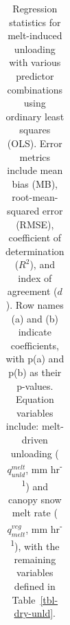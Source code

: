 \documentclass[
  letterpaper,
]{tex/uofsthesis-cs}
\begin{document}
\begin{landscape}

\begin{longtable}[]{@{}
  >{\raggedright\arraybackslash}p{}
  >{\raggedright\arraybackslash}p{}
  >{\raggedright\arraybackslash}p{}
  >{\raggedright\arraybackslash}p{}
  >{\raggedright\arraybackslash}p{}
  >{\raggedright\arraybackslash}p{}@{}}

\caption{\label{tbl-melt-unld}Regression statistics for melt-induced
unloading with various predictor combinations using ordinary least
squares (OLS). Error metrics include mean bias (MB), root-mean-squared
error (RMSE), coefficient of determination (\(R^2\)), and index of
agreement (\(d\)). Row names (a) and (b) indicate coefficients, with
p(a) and p(b) as their p-values. Equation variables include: melt-driven
unloading (\(q_{unld}^{melt}\), mm hr\textsuperscript{-1}) and canopy
snow melt rate (\(q_{melt}^{veg}\), mm hr\textsuperscript{-1}), with the
remaining variables defined in Table~\ref{tbl-dry-unld}.}

\tabularnewline


\end{longtable}
\end{landscape}
\end{document}
